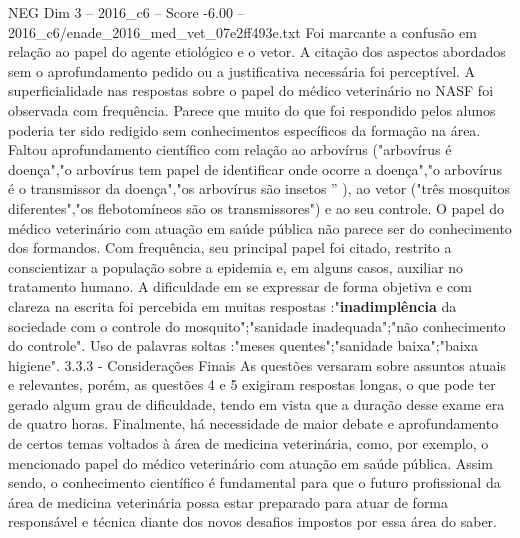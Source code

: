 \begin{textsample}{NEG Dim 3 – 2016\_c6 – Score -6.00 – 2016\_c6/enade\_2016\_med\_vet\_07e2ff493e.txt}
Foi marcante a confusão em relação ao papel do agente etiológico e o vetor.
A citação dos aspectos abordados sem o aprofundamento pedido ou a justificativa necessária foi perceptível.
A superficialidade nas respostas sobre o papel do médico veterinário no NASF foi observada com frequência.
Parece que muito do que foi respondido pelos alunos poderia ter sido redigido sem conhecimentos específicos da formação na área.
Faltou aprofundamento científico com relação ao arbovírus ("arbovírus é doença","o arbovírus tem papel de identificar onde ocorre a doença","o arbovírus é o transmissor da doença","os arbovírus são insetos ” ), ao vetor ("três mosquitos diferentes","os flebotomíneos são os transmissores") e ao seu controle.
O papel do médico veterinário com atuação em saúde pública não parece ser do conhecimento dos formandos.
Com frequência, seu principal papel foi citado, restrito a conscientizar a população sobre a epidemia e, em alguns casos, auxiliar no tratamento humano.
A dificuldade em se expressar de forma objetiva e com clareza na escrita foi percebida em muitas respostas :"\textbf{inadimplência} da sociedade com o controle do mosquito";"sanidade inadequada";"não conhecimento do controle".
Uso de palavras soltas :"meses quentes";"sanidade baixa";"baixa higiene". 3.3.3 - Considerações Finais As questões versaram sobre assuntos atuais e relevantes, porém, as questões 4 e 5 exigiram respostas longas, o que pode ter gerado algum grau de dificuldade, tendo em vista que a duração desse exame era de quatro horas.
Finalmente, há necessidade de maior debate e aprofundamento de certos temas voltados à área de medicina veterinária, como, por exemplo, o mencionado papel do médico veterinário com atuação em saúde pública.
Assim sendo, o conhecimento científico é fundamental para que o futuro profissional da área de medicina veterinária possa estar preparado para atuar de forma responsável e técnica diante dos novos desafios impostos por essa área do saber.

\end{textsample}

